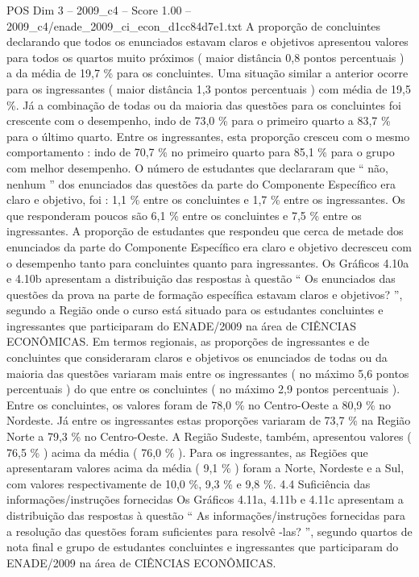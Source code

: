 \begin{textsample}{POS Dim 3 – 2009\_c4 – Score 1.00 – 2009\_c4/enade\_2009\_ci\_econ\_d1cc84d7e1.txt}
A proporção de concluintes declarando que todos os enunciados estavam claros e objetivos apresentou valores para todos os quartos muito próximos ( maior distância 0,8 pontos percentuais ) a da média de 19,7 \% para os concluintes.
Uma situação similar a anterior ocorre para os ingressantes ( maior distância 1,3 pontos percentuais ) com média de 19,5 \%.
Já a combinação de todas ou da maioria das questões para os concluintes foi crescente com o desempenho, indo de 73,0 \% para o primeiro quarto a 83,7 \% para o último quarto.
Entre os ingressantes, esta proporção cresceu com o mesmo comportamento : indo de 70,7 \% no primeiro quarto para 85,1 \% para o grupo com melhor desempenho.
O número de estudantes que declararam que “ não, nenhum ” dos enunciados das questões da parte do Componente Específico era claro e objetivo, foi : 1,1 \% entre os concluintes e 1,7 \% entre os ingressantes.
Os que responderam poucos são 6,1 \% entre os concluintes e 7,5 \% entre os ingressantes.
A proporção de estudantes que respondeu que cerca de metade dos enunciados da parte do Componente Específico era claro e objetivo decresceu com o desempenho tanto para concluintes quanto para ingressantes.
Os Gráficos 4.10a e 4.10b apresentam a distribuição das respostas à questão “ Os enunciados das questões da prova na parte de formação específica estavam claros e objetivos? ”, segundo a Região onde o curso está situado para os estudantes concluintes e ingressantes que participaram do ENADE/2009 na área de CIÊNCIAS ECONÔMICAS.
Em termos regionais, as proporções de ingressantes e de concluintes que consideraram claros e objetivos os enunciados de todas ou da maioria das questões variaram mais entre os ingressantes ( no máximo 5,6 pontos percentuais ) do que entre os concluintes ( no máximo 2,9 pontos percentuais ).
Entre os concluintes, os valores foram de 78,0 \% no Centro-Oeste a 80,9 \% no Nordeste.
Já entre os ingressantes estas proporções variaram de 73,7 \% na Região Norte a 79,3 \% no Centro-Oeste.
A Região Sudeste, também, apresentou valores ( 76,5 \% ) acima da média ( 76,0 \% ).
Para os ingressantes, as Regiões que apresentaram valores acima da média ( 9,1 \% ) foram a Norte, Nordeste e a Sul, com valores respectivamente de 10,0 \%, 9,3 \% e 9,8 \%. 4.4 Suficiência das informações/instruções fornecidas Os Gráficos 4.11a, 4.11b e 4.11c apresentam a distribuição das respostas à questão “ As informações/instruções fornecidas para a resolução das questões foram suficientes para resolvê -las? ”, segundo quartos de nota final e grupo de estudantes concluintes e ingressantes que participaram do ENADE/2009 na área de CIÊNCIAS ECONÔMICAS.

\end{textsample}
